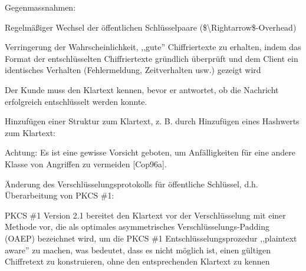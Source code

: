 \documentclass[a4paper]{article}
\begin{document}
\begin{multicols}{3}
\begin{itemize*}
\begin{itemize*}
\begin{itemize*}
                  \end{itemize*}
                  \item       Gegenmassnahmen:
                  \begin{itemize*}
                        \item Regelmäßiger Wechsel der öffentlichen Schlüsselpaare (\$\textbackslash Rightarrow\$-Overhead)
                        \item Verringerung der Wahrscheinlichkeit, ,,gute'' Chiffriertexte zu erhalten, indem das Format der entschlüsselten Chiffriertexte gründlich überprüft und dem Client ein identisches Verhalten (Fehlermeldung, Zeitverhalten usw.) gezeigt wird
                        \item Der Kunde muss den Klartext kennen, bevor er antwortet, ob die Nachricht erfolgreich entschlüsselt werden konnte.
                        \item Hinzufügen einer Struktur zum Klartext, z. B. durch Hinzufügen eines Hashwerts zum Klartext:
                        \begin{itemize*} \item Achtung: Es ist eine gewisse Vorsicht geboten, um Anfälligkeiten für eine andere Klasse von Angriffen zu vermeiden {[}Cop96a{]}. \end{itemize*}
                        \item Änderung des Verschlüsselungsprotokolls für öffentliche Schlüssel, d.h. Überarbeitung von PKCS \#1:
                        \begin{itemize*} \item PKCS \#1 Version 2.1 bereitet den Klartext vor der Verschlüsselung mit einer Methode vor, die als optimales asymmetrisches Verschlüsselungs-Padding (OAEP) bezeichnet wird, um die PKCS \#1 Entschlüsselungsprozedur ,,plaintext aware'' zu machen, was bedeutet, dass es nicht möglich ist, einen gültigen Chiffretext zu konstruieren, ohne den entsprechenden Klartext zu kennen \end{itemize*}
                  \end{itemize*}
            \end{itemize*}


\end{itemize*}
\end{multicols}
\end{document}
